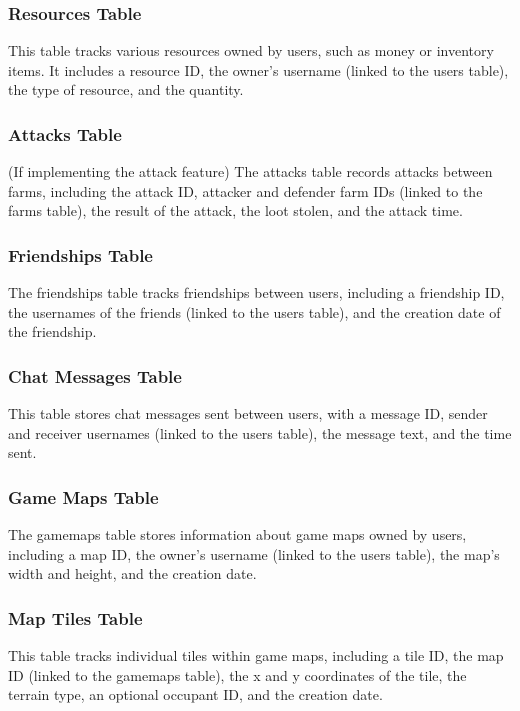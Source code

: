 \documentclass[12pt]{article}
\begin{document}
\subsubsection{Resources Table}
This table tracks various resources owned by users, such as money or inventory items. It includes a resource ID, the owner's username (linked to the users table), the type of resource, and the quantity.

\subsubsection{Attacks Table}
(If implementing the attack feature) The attacks table records attacks between farms, including the attack ID, attacker and defender farm IDs (linked to the farms table), the result of the attack, the loot stolen, and the attack time.

\subsubsection{Friendships Table}
The friendships table tracks friendships between users, including a friendship ID, the usernames of the friends (linked to the users table), and the creation date of the friendship.

\subsubsection{Chat Messages Table}
This table stores chat messages sent between users, with a message ID, sender and receiver usernames (linked to the users table), the message text, and the time sent.

\subsubsection{Game Maps Table}
The game\textunderscore maps table stores information about game maps owned by users, including a map ID, the owner's username (linked to the users table), the map's width and height, and the creation date.

\subsubsection{Map Tiles Table}
This table tracks individual tiles within game maps, including a tile ID, the map ID (linked to the game\textunderscore maps table), the x and y coordinates of the tile, the terrain type, an optional occupant ID, and the creation date.
\end{document}
